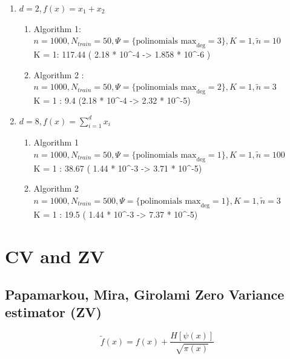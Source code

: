 \documentclass[a4paper]{article}
\begin{document}
\begin{enumerate}
    \item $d =2, f(x) = x_1 + x_2$
    \begin{enumerate}
    \item Algorithm 1: $n = 1000,N_{train} = 50, \Psi = \{\text{polinomials max}_\text{deg} = 3\}, K =1, \tilde{n} = 10$\\
    K = 1: 117.44 ( 2.18 * 10^{-4} -> 1.858 * 10^{-6} )\\

    
    \item Algorithm 2 :$n = 1000,N_{train} = 50, \Psi = \{\text{polinomials max}_\text{deg} = 2\}, K =1, \tilde{n} = 3$\\
    K = 1 : 9.4 (2.18 * 10^{-4} -> 2.32 * 10^{-5})\\
    
    \end{enumerate}
    \item $d =8, f(x) = \sum_{i=1}^d x_i$
    \begin{enumerate}
        
    \item Algorithm 1 $n = 1000,N_{train} = 50, \Psi = \{\text{polinomials max}_\text{deg} = 1\}, K =1, \tilde{n} = 100$\\
    K = 1 : 38.67  ( 1.44 * 10^{-3} -> 3.71 * 10^{-5})
    
    \item Algorithm 2 $n = 1000,N_{train} = 500, \Psi = \{\text{polinomials max}_\text{deg} = 1\}, K =1, \tilde{n} = 3$\\
    K = 1 : 19.5 ( 1.44 * 10^{-3} -> 7.37 * 10^{-5})
    \end{enumerate}
\end{enumerate}












\section{CV and ZV}

\subsection{Papamarkou, Mira, Girolami Zero Variance estimator (ZV)}

$$\tilde{f}(x) = f(x) + \frac{H \left[\psi(x) \right]}{\sqrt{\pi(x)}}$$
\end{document}
